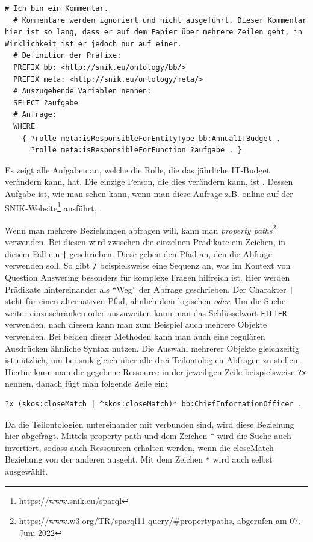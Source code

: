 \begin{lstlisting}[language=SPARQL]
  # Ich bin ein Kommentar.
  # Kommentare werden ignoriert und nicht ausgeführt. Dieser Kommentar hier ist so lang, dass er auf dem Papier über mehrere Zeilen geht, in Wirklichkeit ist er jedoch nur auf einer.
  # Definition der Präfixe:
  PREFIX bb: <http://snik.eu/ontology/bb/>
  PREFIX meta: <http://snik.eu/ontology/meta/>
  # Auszugebende Variablen nennen:
  SELECT ?aufgabe
  # Anfrage:
  WHERE
    { ?rolle meta:isResponsibleForEntityType bb:AnnualITBudget .
      ?rolle meta:isResponsibleForFunction ?aufgabe . }
\end{lstlisting}
Es zeigt alle Aufgaben an, welche die Rolle, die das jährliche IT-Budget verändern kann, hat.
Die einzige Person, die dies verändern kann, ist .
Dessen Aufgabe ist, wie man sehen kann, wenn man diese Anfrage z.B. online auf der SNIK-Website\footnote{\url{https://www.snik.eu/sparql}} ausführt, .

Wenn man mehrere Beziehungen abfragen will, kann man \emph{property paths}\footnote{\url{https://www.w3.org/TR/sparql11-query/\#propertypaths}, abgerufen am 07. Juni 2022} verwenden.
Bei diesen wird zwischen die einzelnen Prädikate ein Zeichen, in diesem Fall ein \texttt{|} geschrieben.
Diese geben den Pfad an, den die Abfrage verwenden soll.
So gibt \texttt{/} beispielsweise eine Sequenz an, was im Kontext von Question Answering besonders für komplexe Fragen hilfreich ist.
Hier werden Prädikate hintereinander als \enquote{Weg} der Abfrage geschrieben.
Der Charakter \texttt{|} steht für einen alternativen Pfad, ähnlich dem logischen \emph{oder}.
Um die Suche weiter einzuschränken oder auszuweiten kann man das Schlüsselwort \texttt{FILTER} verwenden, nach diesem kann man zum Beispiel auch mehrere Objekte verwenden.
Bei beiden dieser Methoden kann man auch eine regulären Ausdrücken ähnliche Syntax nutzen.
Die Auswahl mehrerer Objekte gleichzeitig ist nützlich, um bei \acs{snik} gleich über alle drei Teilontologien Abfragen zu stellen.
Hierfür kann man die gegebene Ressource in der jeweiligen Zeile beispielsweise \texttt{?x} nennen, danach fügt man folgende Zeile ein:
\begin{lstlisting}[language=SPARQL]
?x (skos:closeMatch | ^skos:closeMatch)* bb:ChiefInformationOfficer .
\end{lstlisting}
Da die Teilontologien untereinander mit  verbunden sind, wird diese Beziehung hier abgefragt.
Mittels property path und dem Zeichen \texttt{\^} wird die Suche auch invertiert, sodass auch Ressourcen erhalten werden, wenn die closeMatch-Beziehung von der anderen ausgeht.
Mit dem Zeichen \texttt{*} wird auch  selbst ausgewählt.

